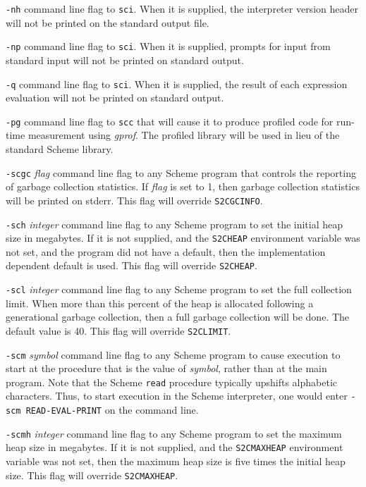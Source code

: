 \documentclass[10pt,twocolumn]{article}
\begin{document}
\texttt{-nh} command line flag to \texttt{sci}.  When it is supplied,
the interpreter version header will not be printed on the standard
output file.

\texttt{-np} command line flag to \texttt{sci}.  When it is supplied,
prompts for input from standard input will not be printed on standard
output.

\texttt{-q} command line flag to \texttt{sci}.  When it is supplied,
the result of each expression evaluation will not be printed on
standard output.

\texttt{-pg} command line flag to \texttt{scc} that will cause it to
produce profiled code for run-time measurement using \emph{gprof}.
The profiled library will be used in lieu of the standard Scheme
library.

\texttt{-scgc} \emph{flag} command line flag to any Scheme program
that controls the reporting of garbage collection statistics.  If
\emph{flag} is set to 1, then garbage collection statistics will be
printed on stderr.  This flag will override \texttt{S2CGCINFO}.

\texttt{-sch} \emph{integer} command line flag to any Scheme program
to set the initial heap size in megabytes.  If it is not supplied, and
the \texttt{S2CHEAP} environment variable was not set, and the program
did not have a default, then the implementation dependent default is
used.  This flag will override \texttt{S2CHEAP}.

\texttt{-scl} \emph{integer} command line flag to any Scheme program
to set the full collection limit.  When more than this percent of the
heap is allocated following a generational garbage collection, then a
full garbage collection will be done.  The default value is 40.  This
flag will override \texttt{S2CLIMIT}.

\texttt{-scm} \emph{symbol} command line flag to any Scheme program to
cause execution to start at the procedure that is the value of
\emph{symbol}, rather than at the main program.  Note that the Scheme
\texttt{read} procedure typically upshifts alphabetic characters.
Thus, to start execution in the Scheme interpreter, one would enter
\texttt{-scm READ-EVAL-PRINT} on the command line.

\texttt{-scmh} \emph{integer} command line flag to any Scheme program
to set the maximum heap size in megabytes.  If it is not supplied, and
the \texttt{S2CMAXHEAP} environment variable was not set, then the
maximum heap size is five times the initial heap size. This flag will
override \texttt{S2CMAXHEAP}.
\end{document}
